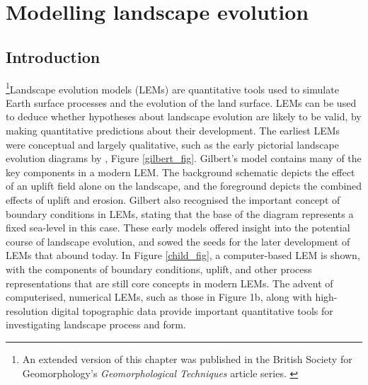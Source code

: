 \chapter{Modelling landscape evolution}
\label{chapter_landscape_evol}

\section{Introduction}
\footnote{An extended version of this chapter was published in the British Society for Geomorphology's \textit{Geomorphological Techniques} article series. \citep{valters2016modelling}}Landscape evolution models (LEMs) are quantitative tools used to simulate Earth surface processes and the evolution of the land surface. LEMs can be used to deduce whether hypotheses about landscape evolution are likely to be valid, by making quantitative predictions about their development. The earliest LEMs were conceptual and largely qualitative, such as the early pictorial landscape evolution diagrams by \citet{Gilbert1877}, Figure \ref{gilbert_fig}. Gilbert’s model contains many of the key components in a modern LEM. The background schematic depicts the effect of an uplift field alone on the landscape, and the foreground depicts the combined effects of uplift and erosion. Gilbert also recognised the important concept of boundary conditions in LEMs, stating that the base of the diagram represents a fixed sea-level in this case.  These early models offered insight into the potential course of landscape evolution, and sowed the seeds for the later development of LEMs that abound today. In Figure \ref{child_fig}, a computer-based LEM \citep[CHILD,][]{Tucker2001} is shown, with the components of boundary conditions, uplift, and other process representations that are still core concepts in modern LEMs. The advent of computerised, numerical LEMs, such as those in Figure 1b, along with high-resolution digital topographic data provide important quantitative tools for investigating landscape process and form. 

